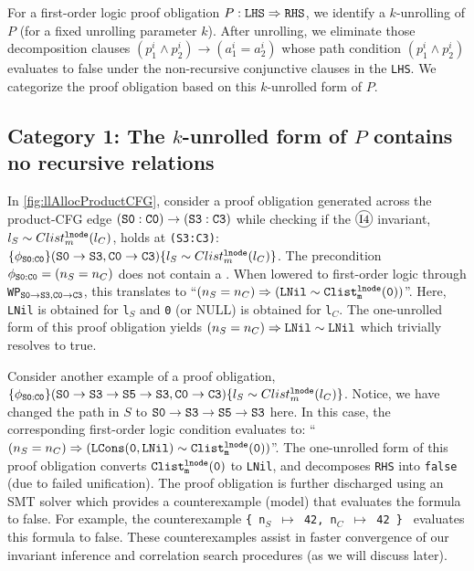 For a first-order
logic proof obligation
$P: {\tt LHS}\Rightarrow{\tt RHS}$, we identify
a $k$-unrolling of $P$ (for a fixed unrolling parameter $k$).
After unrolling,
we eliminate those decomposition clauses
$(p^i_1\land{}p^i_2)\rightarrow{}(a^i_1=a^i_2)$ whose
path condition $(p^i_1\land{}p^i_2)$ evaluates to false
under the non-recursive conjunctive clauses in the {\tt LHS}. We categorize the proof obligation based
on this $k$-unrolled form of $P$.

\subsection{Category 1: The $k$-unrolled form of $P$
contains no recursive relations}
\label{sec:cat1}
In \cref{fig:llAllocProductCFG}, consider a proof obligation generated
across the product-CFG edge ${\tt (S0:C0) \rightarrow (S3:C3)}$
while checking if the ${\small \circled{I4}}$ invariant, $l_{S}\sim{}Clist^{{\tt lnode}}_{m}(l_{C})$,
holds at {\tt (S3:C3)}:
$\{\phi_{{\tt S0:C0}}\} ({\tt S0\rightarrow S3}, {\tt C0\rightarrow C3}) \{l_{S}\sim{}Clist^{{\tt lnode}}_{m}(l_{C})\}$.
The precondition $\phi_{{\tt S0:C0}}=(n_S=n_C)$ does not contain
a \recursiveRelation{}.
When lowered to first-order logic through {\tt WP$_{{\tt S0\rightarrow S3},{\tt C0\rightarrow C3}}$}, this translates to
``$(n_S=n_C)\Rightarrow({\tt LNil}\sim{}{\tt Clist^{{\tt lnode}}_{m}(0)})$''.
Here, {\tt LNil} is obtained for {\tt l$_{S}$} and {\tt 0} (or NULL) is
obtained for {\tt l$_C$}.
The one-unrolled form of this proof obligation yields
$(n_S=n_C)\Rightarrow{}{\tt LNil}\sim{}{\tt LNil}$ which trivially resolves to true.

Consider another example of a proof obligation,
$\{\phi_{{\tt S0:C0}}\} ({\tt S0\rightarrow S3\rightarrow S5\rightarrow S3}, \\{\tt C0\rightarrow C3}) \{l_{S}\sim{}Clist^{{\tt lnode}}_{m}(l_{C})\}$.
Notice, we have changed the path in $S$ to ${\tt S0\rightarrow S3\rightarrow S5\rightarrow S3}$ here.
In this case, the corresponding first-order logic condition evaluates
to: ``$(n_S=n_C)\Rightarrow({\tt LCons(0, LNil)}\sim{}{\tt Clist^{{\tt lnode}}_{m}(0)})$''.
The one-unrolled form of this proof obligation converts
${\tt Clist^{{\tt lnode}}_{m}(0)}$ to {\tt LNil}, and
decomposes {\tt RHS} into {\tt false} (due to failed unification).
The proof obligation is further discharged using an SMT solver
which provides a counterexample (model) that evaluates the
formula to false. For example, the counterexample {\tt \{ n$_S$ $\mapsto$ 42, n$_C$ $\mapsto$ 42 \} }
evaluates this formula to false.
These counterexamples
assist in faster convergence
of our invariant inference and correlation search procedures (as we will discuss later).

